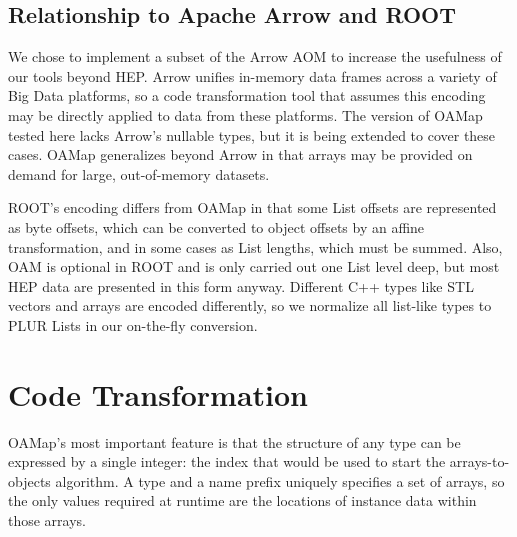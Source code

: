 \documentclass[10pt, conference, compsocconf]{IEEEtran}
\begin{document}
\subsection{Relationship to Apache Arrow and ROOT}

We chose to implement a subset of the Arrow AOM to increase the usefulness of our tools beyond HEP. Arrow unifies in-memory data frames across a variety of Big Data platforms\cite{arrow}, so a code transformation tool that assumes this encoding may be directly applied to data from these platforms. The version of OAMap tested here lacks Arrow's nullable types, but it is being extended to cover these cases. OAMap generalizes beyond Arrow in that arrays may be provided on demand for large, out-of-memory datasets.

ROOT's encoding differs from OAMap in that some List offsets are represented as byte offsets, which can be converted to object offsets by an affine transformation, and in some cases as List lengths, which must be summed. Also, OAM is optional in ROOT and is only carried out one List level deep, but most HEP data are presented in this form anyway. Different C++ types like STL vectors and arrays are encoded differently, so we normalize all list-like types to PLUR Lists in our on-the-fly conversion.



\section{Code Transformation}

OAMap's most important feature is that the structure of any type can be expressed by a single integer: the index that would be used to start the arrays-to-objects algorithm. A type and a name prefix uniquely specifies a set of arrays, so the only values required at runtime are the locations of instance data within those arrays.
\end{document}

